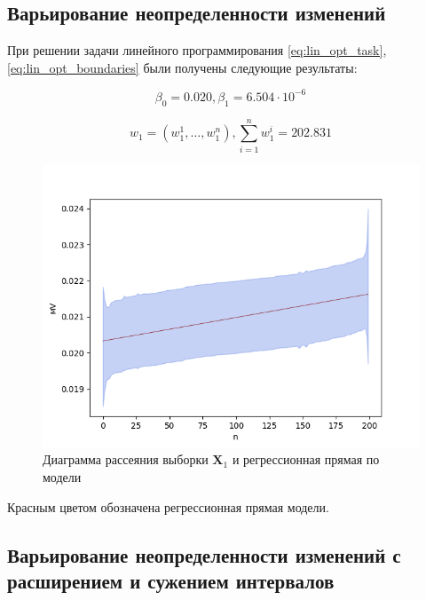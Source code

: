 \subsection{Варьирование неопределенности изменений}

При решении задачи линейного программирования \eqref{eq:lin_opt_task}, \eqref{eq:lin_opt_boundaries} были получены следующие результаты: 

\begin{equation*}
	\beta_0 = 0.020, \beta_1 = 6.504 \cdot 10 ^ {-6} 
\end{equation*}

\begin{equation*}
	w_1 = (w^{1}_1, \ldots, w^{n}_1), \sum\limits_{i=1}^{n} w^{i}_1 = 202.831
\end{equation*}

\begin{figure}[H]
	\begin{center}
		\includegraphics[scale = 0.55]{resources/diagram_and_regress_1.png}
	\end{center}
	\caption{Диаграмма рассеяния выборки $\bm{X}_1$ и регрессионная прямая по модели}
\end{figure}

Красным цветом обозначена регрессионная прямая модели. 

\subsection{Варьирование неопределенности изменений с расширением и сужением интервалов}

